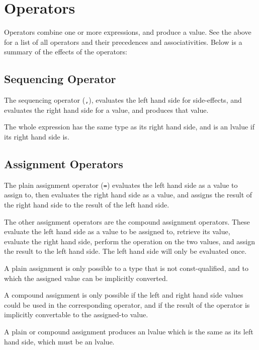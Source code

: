 \documentclass[letterpaper,12pt]{book}
\begin{document}
\section{Operators}

Operators combine one or more expressions, and produce a value. See the above for a list of all operators and their precedences and associativities. Below is a summary of the effects of the operators:

\subsection{Sequencing Operator}



The sequencing operator (\texttt{,}), evaluates the left hand side for side-effects, and evaluates the right hand side for a value, and produces that value.

The whole expression has the same type as its right hand side, and is an lvalue if its right hand side is.

\subsection{Assignment Operators}



The plain assignment operator (\texttt{=}) evaluates the left hand side as a value to assign to, then evaluates the right hand side as a value, and assigns the result of the right hand side to the result of the left hand side.

The other assignment operators are the compound assignment operators. These evaluate the left hand side as a value to be assigned to, retrieve its value, evaluate the right hand side, perform the operation on the two values, and assign the result to the left hand side. The left hand side will only be evaluated once.

A plain assignment is only possible to a type that is not const-qualified, and to which the assigned value can be implicitly converted.

A compound assignment is only possible if the left and right hand side values could be used in the corresponding operator, and if the result of the operator is implicitly convertable to the assigned-to value.

A plain or compound assignment produces an lvalue which is the same as its left hand side, which must be an lvalue.
\end{document}
